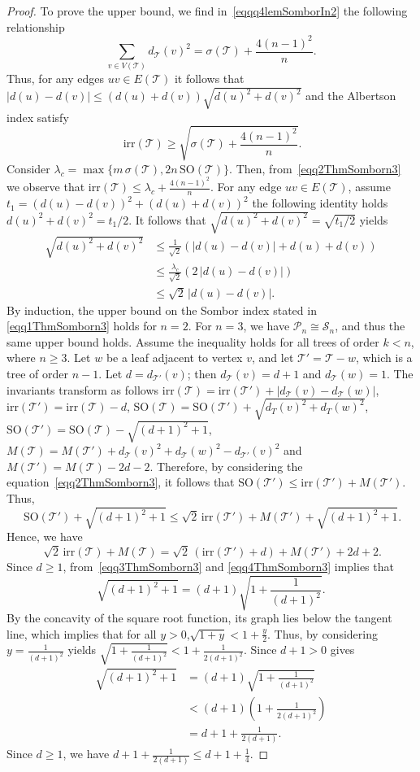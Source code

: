 \documentclass[10pt,a4paper]{amsart}
\newcommand{\SO}{\mathrm{SO}}
\newcommand{\TT}{\mathcal{T}}
\newcommand{\irr}{\mathrm{irr}}
\begin{document}
\begin{proof}
To prove the upper bound, we find in~\eqref{eqqq4lemSomborIn2} the following relationship
\[
\sum_{v\in V(\TT)}d_\TT(v)^2=\sigma(\TT)+\frac{4(n-1)^2}{n}.
\]
Thus, for any edges $uv\in E(\TT)$ it follows that $|d(u)-d(v)|\leqslant (d(u)+d(v))\sqrt{d(u)^2+d(v)^2}$  and the Albertson index satisfy
\begin{equation}~\label{eqq2ThmSomborn3}
\irr(\TT)\geqslant \sqrt{\sigma(\TT)+\frac{4(n-1)^2}{n}}.
\end{equation}
 Consider $\lambda_c=\max\{m\,\sigma(\TT),2n\,\SO(\TT)\}$. Then, from~\eqref{eqq2ThmSomborn3} we observe that $\irr(\TT)\leqslant \lambda_c+\frac{4(n-1)^2}{n}$. For any edge $uv \in E(\TT)$, assume $t_1=(d(u)-d(v))^2+(d(u)+d(v))^2$ the following identity holds $d(u)^2+d(v)^2=t_1/2$. It follows that $\sqrt{d(u)^2+d(v)^2}=\sqrt{t_1/2}$  yields
 \begin{align*}
 \sqrt{d(u)^2+d(v)^2} &\leqslant \frac{1}{\sqrt{2}}(|d(u)-d(v)|+d(u)+d(v))\\
 &\leqslant \frac{\lambda_c}{\sqrt{2}}(2\,|d(u)-d(v)|)\\
 &\leqslant \sqrt{2}\,|d(u)-d(v)|.
 \end{align*}
By induction, the upper bound on the Sombor index stated in \eqref{eqq1ThmSomborn3} holds for $n=2$. For $n=3$, we have $\mathcal{P}_n \cong \mathcal{S}_n$, and thus the same upper bound holds. Assume the inequality holds for all trees of order $k<n$, where $n \geqslant 3$. Let $w$ be a leaf adjacent to vertex $v$, and let $\TT'=\TT-w$, which is a tree of order $n-1$. Let $d=d_{\TT'}(v)$; then $d_\TT(v)=d+1$ and $d_\TT(w)=1$. The invariants transform as follows $\irr(\TT)=\irr(\TT')+|d_\TT(v)-d_\TT(w)|$, $\irr(\TT')=\irr(\TT)-d$, $\SO(\TT)=\SO(\TT')+\sqrt{d_T(v)^2 + d_T(w)^2}$, $\SO(\TT')=\SO(\TT)-\sqrt{(d+1)^2+1}$, $M(\TT)=M(\TT')+d_\TT(v)^2+d_\TT(w)^2-d_{\TT'}(v)^2$ and $M(\TT')=M(\TT)-2d-2$. Therefore, by considering the equation~\eqref{eqq2ThmSomborn3}, it follows that $\SO(\TT')\leqslant \irr(\TT')+M(\TT')$. Thus,  
\begin{equation}~\label{eqq3ThmSomborn3}
\SO(\TT')+\sqrt{(d+1)^2+1}\leqslant \sqrt{2}\, \irr(\TT')+M(\TT')+ \sqrt{(d+1)^2+1}.
\end{equation}
Hence, we have 
\begin{equation}~\label{eqq4ThmSomborn3}
\sqrt{2}\,\irr(\TT)+M(\TT)=\sqrt{2}\,(\irr(\TT')+d)+M(\TT')+2d+2.
\end{equation}
Since $d \geqslant 1$, from~\eqref{eqq3ThmSomborn3} and \eqref{eqq4ThmSomborn3} implies that
\[
\sqrt{(d+1)^2+1}=(d+1)\sqrt{1+\frac{1}{(d+1)^2}}.
\]
By the concavity of the square root function, its graph lies below the tangent line, which implies that for all $y>0$,$\sqrt{1+y}<1+\frac{y}{2}$. Thus, by considering $y=\frac{1}{(d+1)^2}$ yields $\sqrt{1+\frac{1}{(d+1)^2}}<1+\frac{1}{2(d+1)^2}$. Since $d+1>0$ gives
\begin{align*}
\sqrt{(d+1)^2+1}&= (d+1)\sqrt{1+\frac{1}{(d+1)^2}}\\
&<(d+1) \left(1+\frac{1}{2(d+1)^2}\right)\\
&=d+1+\frac{1}{2(d+1)}.
\end{align*}
Since $d \geqslant 1$, we have $d+1+\frac{1}{2(d+1)}\leqslant d+1+\frac{1}{4}$. 


\end{proof}
\end{document}
